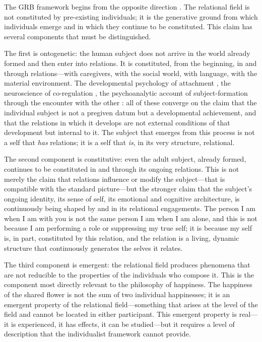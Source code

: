 The GRB framework begins from the opposite direction \parencite{wan2024grb}. The relational field is not constituted by pre-existing individuals; it is the generative ground from which individuals emerge and in which they continue to be constituted. This claim has several components that must be distinguished.

The first is ontogenetic: the human subject does not arrive in the world already formed and then enter into relations. It is constituted, from the beginning, in and through relations---with caregivers, with the social world, with language, with the material environment. The developmental psychology of attachment \parencite{bowlby1969}, the neuroscience of co-regulation \parencite{feldman2007}, the psychoanalytic account of subject-formation through the encounter with the other \parencite{lacan2006}: all of these converge on the claim that the individual subject is not a pregiven datum but a developmental achievement, and that the relations in which it develops are not external conditions of that development but internal to it. The subject that emerges from this process is not a self that \emph{has} relations; it is a self that \emph{is}, in its very structure, relational.

The second component is constitutive: even the adult subject, already formed, continues to be constituted in and through its ongoing relations. This is not merely the claim that relations influence or modify the subject---that is compatible with the standard picture---but the stronger claim that the subject's ongoing identity, its sense of self, its emotional and cognitive architecture, is continuously being shaped by and in its relational engagements. The person I am when I am with you is not the same person I am when I am alone, and this is not because I am performing a role or suppressing my true self; it is because my self is, in part, constituted by this relation, and the relation is a living, dynamic structure that continuously generates the selves it relates.

The third component is emergent: the relational field produces phenomena that are not reducible to the properties of the individuals who compose it. This is the component most directly relevant to the philosophy of happiness. The happiness of the shared flower is not the sum of two individual happinesses; it is an emergent property of the relational field---something that arises at the level of the field and cannot be located in either participant. This emergent property is real---it is experienced, it has effects, it can be studied---but it requires a level of description that the individualist framework cannot provide.

